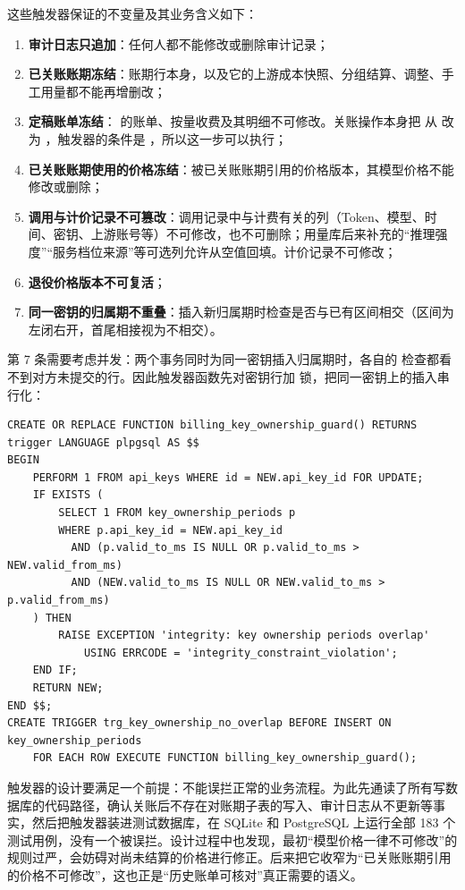 这些触发器保证的不变量及其业务含义如下：
\begin{enumerate}
  \item \textbf{审计日志只追加}：任何人都不能修改或删除审计记录；
  \item \textbf{已关账账期冻结}：账期行本身，以及它的上游成本快照、分组结算、调整、手工用量都不能再增删改；
  \item \textbf{定稿账单冻结}： 的账单、按量收费及其明细不可修改。关账操作本身把  从  改为 ，触发器的条件是 ，所以这一步可以执行；
  \item \textbf{已关账账期使用的价格冻结}：被已关账账期引用的价格版本，其模型价格不能修改或删除；
  \item \textbf{调用与计价记录不可篡改}：调用记录中与计费有关的列（Token、模型、时间、密钥、上游账号等）不可修改，也不可删除；用量库后来补充的“推理强度”“服务档位来源”等可选列允许从空值回填。计价记录不可修改；
  \item \textbf{退役价格版本不可复活}；
  \item \textbf{同一密钥的归属期不重叠}：插入新归属期时检查是否与已有区间相交（区间为左闭右开，首尾相接视为不相交）。
\end{enumerate}

第 7 条需要考虑并发：两个事务同时为同一密钥插入归属期时，各自的  检查都看不到对方未提交的行。因此触发器函数先对密钥行加  锁，把同一密钥上的插入串行化：

\begin{lstlisting}[language=PLpgSQL]
CREATE OR REPLACE FUNCTION billing_key_ownership_guard() RETURNS trigger LANGUAGE plpgsql AS $$
BEGIN
    PERFORM 1 FROM api_keys WHERE id = NEW.api_key_id FOR UPDATE;
    IF EXISTS (
        SELECT 1 FROM key_ownership_periods p
        WHERE p.api_key_id = NEW.api_key_id
          AND (p.valid_to_ms IS NULL OR p.valid_to_ms > NEW.valid_from_ms)
          AND (NEW.valid_to_ms IS NULL OR NEW.valid_to_ms > p.valid_from_ms)
    ) THEN
        RAISE EXCEPTION 'integrity: key ownership periods overlap'
            USING ERRCODE = 'integrity_constraint_violation';
    END IF;
    RETURN NEW;
END $$;
CREATE TRIGGER trg_key_ownership_no_overlap BEFORE INSERT ON key_ownership_periods
    FOR EACH ROW EXECUTE FUNCTION billing_key_ownership_guard();
\end{lstlisting}

触发器的设计要满足一个前提：不能误拦正常的业务流程。为此先通读了所有写数据库的代码路径，确认关账后不存在对账期子表的写入、审计日志从不更新等事实，然后把触发器装进测试数据库，在 SQLite 和 PostgreSQL 上运行全部 183 个测试用例，没有一个被误拦。设计过程中也发现，最初“模型价格一律不可修改”的规则过严，会妨碍对尚未结算的价格进行修正。后来把它收窄为“已关账账期引用的价格不可修改”，这也正是“历史账单可核对”真正需要的语义。

